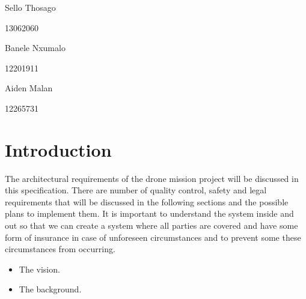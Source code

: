 \documentclass{article}
\begin{document}
\begin{titlepage}
\begin{center}
			\begin{minipage}{0.4\textwidth}
				\begin{flushleft} \large
					Sello {Thosago}
				\end{flushleft}
			\end{minipage}
			\begin{minipage}{0.4\textwidth}
				\begin{flushright} \large
					\emph{}
					13062060
				\end{flushright}
			\end{minipage}
			
			\begin{minipage}{0.4\textwidth}
				\begin{flushleft} \large
					Banele {Nxumalo}
				\end{flushleft}
			\end{minipage}
			\begin{minipage}{0.4\textwidth}
				\begin{flushright} \large
					\emph{}
					12201911
				\end{flushright}
			\end{minipage}
			
			\begin{minipage}{0.4\textwidth}
				\begin{flushleft} \large
					Aiden {Malan}
				\end{flushleft}
			\end{minipage}
			\begin{minipage}{0.4\textwidth}
				\begin{flushright} \large
					\emph{}
					12265731
				\end{flushright}
			\end{minipage}
			
			
			\vfill
			
		\end{center}
	\end{titlepage}
	\footnotesize
	\normalsize
	
	
	\tableofcontents
	\newpage
	
	\newpage %
	\section{Introduction} 
	The architectural requirements of the drone mission project will be discussed in this specification. There are number of quality control, safety and legal requirements that will be discussed in the following sections and the possible plans to implement them. It is important to understand the system inside and out so that we can create a system where all parties are covered and have some form of insurance in case of unforeseen circumstances and to prevent some these circumstances from occurring.
	\begin{itemize} 
		\item The vision.
		\item The background.
	\end{itemize}
	
\end{document}
